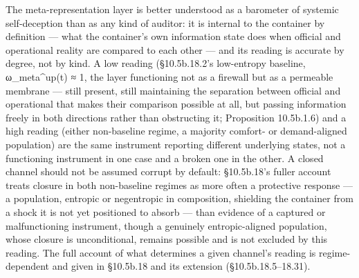 \documentclass[
]{article}
\begin{document}
The meta-representation layer is better understood as a barometer of
systemic self-deception than as any kind of auditor: it is internal to
the container by definition --- what the container's own information
state does when official and operational reality are compared to each
other --- and its reading is accurate by degree, not by kind. A low
reading (§10.5b.18.2's low-entropy baseline, ω\_meta\^{}up(t) ≈ 1, the
layer functioning not as a firewall but as a permeable membrane ---
still present, still maintaining the separation between official and
operational that makes their comparison possible at all, but passing
information freely in both directions rather than obstructing it;
Proposition 10.5b.1.6) and a high reading (either non-baseline regime, a
majority comfort- or demand-aligned population) are the same instrument
reporting different underlying states, not a functioning instrument in
one case and a broken one in the other. A closed channel should not be
assumed corrupt by default: §10.5b.18's fuller account treats closure in
both non-baseline regimes as more often a protective response --- a
population, entropic or negentropic in composition, shielding the
container from a shock it is not yet positioned to absorb --- than
evidence of a captured or malfunctioning instrument, though a genuinely
entropic-aligned population, whose closure is unconditional, remains
possible and is not excluded by this reading. The full account of what
determines a given channel's reading is regime-dependent and given in
§10.5b.18 and its extension (§10.5b.18.5--18.31).
\end{document}
